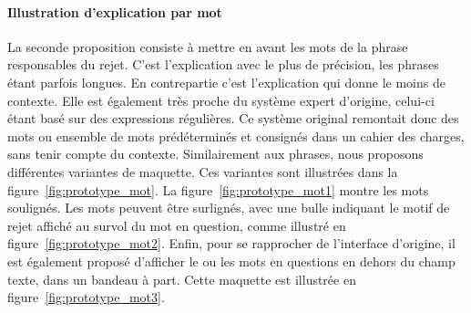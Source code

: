 \paragraph{Illustration d'explication par mot}
 La seconde proposition consiste à mettre en avant les mots de la phrase responsables du rejet.
 C'est l'explication avec le plus de précision, les phrases étant parfois longues. En contrepartie c'est l'explication qui donne le moins de contexte. Elle est également très proche du système expert d'origine, celui-ci étant basé sur des expressions régulières. Ce système original remontait donc des mots ou ensemble de mots prédéterminés et consignés dans un cahier des charges, sans tenir compte du contexte.
 Similairement aux phrases, nous proposons différentes variantes de maquette. Ces variantes sont illustrées dans la figure~\ref{fig:prototype_mot}. La figure~\ref{fig:prototype_mot1} montre les mots soulignés. Les mots peuvent être surlignés, avec une bulle indiquant le motif de rejet affiché au survol du mot en question, comme illustré en figure~\ref{fig:prototype_mot2}. Enfin, pour se rapprocher de l'interface d'origine, il est également proposé d'afficher le ou les mots en questions en dehors du champ texte, dans un bandeau à part. Cette maquette est illustrée en figure~\ref{fig:prototype_mot3}.
